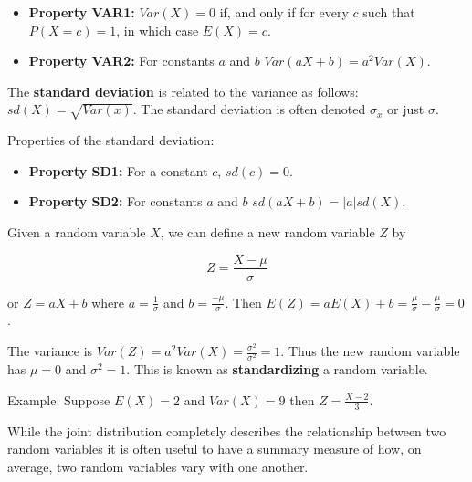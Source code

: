 \documentclass[11pt]{article}
\begin{document}
\begin{itemize}
 \item[] \textbf{Property VAR1:} $Var(X) = 0$ if, and only if for every $c$ such that $P(X=c) = 1$, in which
         case $E(X) = c$.
 \item[] \textbf{Property VAR2:} For constants $a$ and $b$ $Var(aX + b) = a^{2} Var(X)$.
\end{itemize}

\vspace{2mm}

The \textbf{standard deviation} is related to the variance as follows: $sd(X) = \sqrt{Var(x)}$. The standard 
deviation is often denoted $\sigma_{x}$ or just $\sigma$.

\vspace{2mm}

Properties of the standard deviation:

\begin{itemize}
 \item[] \textbf{Property SD1:} For a constant $c$, $sd(c) = 0$.
 \item[] \textbf{Property SD2:} For constants $a$ and $b$ $sd(aX + b) = |a|sd(X)$.
\end{itemize}

\vspace{2mm}

Given a random variable $X$, we can define a new random variable $Z$ by 

\begin{equation*}
Z = \frac{X - \mu}{\sigma}
\end{equation*}

or $Z = aX + b$ where $a = \frac{1}{\sigma}$ and $b = \frac{-\mu}{\sigma}$. Then 
$E(Z) = aE(X) + b = \frac{\mu}{\sigma} - \frac{\mu}{\sigma} = 0$.

\vspace{2mm}

The variance is $Var(Z) = a^{2}Var(X) = \frac{\sigma^{2}}{\sigma^{2}} = 1$. Thus the new random variable
has $\mu = 0$ and $\sigma^{2} = 1$. This is known as \textbf{standardizing} a random variable.

\vspace{2mm}

Example: Suppose $E(X) = 2$ and $Var(X) = 9$ then $Z = \frac{X - 2}{3}$.

\vspace{2mm}

While the joint distribution completely describes the relationship between two random variables it is often useful
to have a summary measure of how, on average, two random variables vary with one another.
\end{document}
